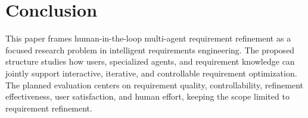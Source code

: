 \section{Conclusion}
\label{conclusion}
This paper frames human-in-the-loop multi-agent requirement refinement as a focused research problem in intelligent requirements engineering. The proposed structure studies how users, specialized agents, and requirement knowledge can jointly support interactive, iterative, and controllable requirement optimization. The planned evaluation centers on requirement quality, controllability, refinement effectiveness, user satisfaction, and human effort, keeping the scope limited to requirement refinement.
